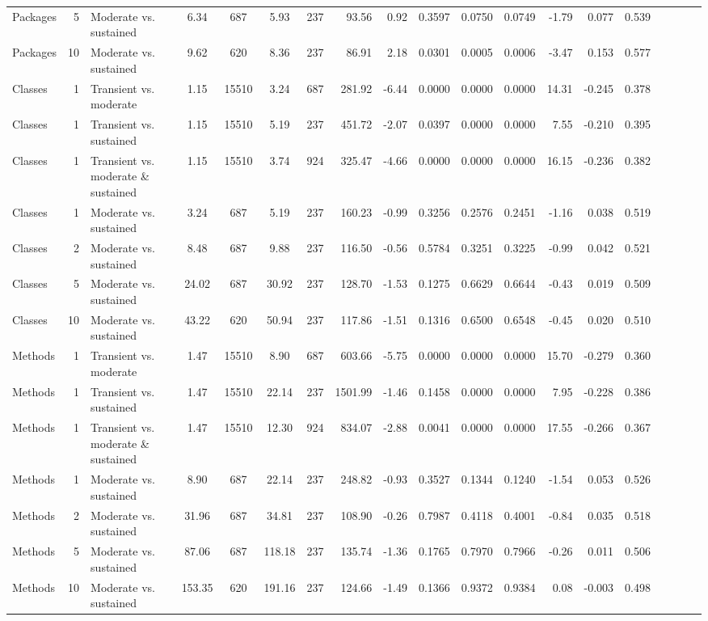 \begin{table}[H]
{\begin{tabular}{l r p{4cm} c c c c r r r r r r r r r r r r}
Packages & 5 & Moderate vs. sustained &  6.34 & 687 & 5.93 & 237 & 93.56 & 0.92 & 0.3597 & 0.0750 & 0.0749 & -1.79 & 0.077 & 0.539 \\ 
Packages & 10 & Moderate vs. sustained &  9.62 & 620 & 8.36 & 237 & 86.91 & 2.18 & 0.0301 & 0.0005 & 0.0006 & -3.47 & 0.153 & 0.577 \\ 
Classes & 1 & Transient vs. moderate &  1.15 & 15510 & 3.24 & 687 & 281.92 & -6.44 & 0.0000 & 0.0000 & 0.0000 & 14.31 & -0.245 & 0.378 \\ 
Classes & 1 & Transient vs. sustained &  1.15 & 15510 & 5.19 & 237 & 451.72 & -2.07 & 0.0397 & 0.0000 & 0.0000 & 7.55 & -0.210 & 0.395 \\ 
Classes & 1 & Transient vs. moderate \& sustained &  1.15 & 15510 & 3.74 & 924 & 325.47 & -4.66 & 0.0000 & 0.0000 & 0.0000 & 16.15 & -0.236 & 0.382 \\ 
Classes & 1 & Moderate vs. sustained &  3.24 & 687 & 5.19 & 237 & 160.23 & -0.99 & 0.3256 & 0.2576 & 0.2451 & -1.16 & 0.038 & 0.519 \\ 
Classes & 2 & Moderate vs. sustained &  8.48 & 687 & 9.88 & 237 & 116.50 & -0.56 & 0.5784 & 0.3251 & 0.3225 & -0.99 & 0.042 & 0.521 \\ 
Classes & 5 & Moderate vs. sustained &  24.02 & 687 & 30.92 & 237 & 128.70 & -1.53 & 0.1275 & 0.6629 & 0.6644 & -0.43 & 0.019 & 0.509 \\ 
Classes & 10 & Moderate vs. sustained &  43.22 & 620 & 50.94 & 237 & 117.86 & -1.51 & 0.1316 & 0.6500 & 0.6548 & -0.45 & 0.020 & 0.510 \\ 
Methods & 1 & Transient vs. moderate &  1.47 & 15510 & 8.90 & 687 & 603.66 & -5.75 & 0.0000 & 0.0000 & 0.0000 & 15.70 & -0.279 & 0.360 \\ 
Methods & 1 & Transient vs. sustained &  1.47 & 15510 & 22.14 & 237 & 1501.99 & -1.46 & 0.1458 & 0.0000 & 0.0000 & 7.95 & -0.228 & 0.386 \\ 
Methods & 1 & Transient vs. moderate \& sustained &  1.47 & 15510 & 12.30 & 924 & 834.07 & -2.88 & 0.0041 & 0.0000 & 0.0000 & 17.55 & -0.266 & 0.367 \\ 
Methods & 1 & Moderate vs. sustained &  8.90 & 687 & 22.14 & 237 & 248.82 & -0.93 & 0.3527 & 0.1344 & 0.1240 & -1.54 & 0.053 & 0.526 \\ 
Methods & 2 & Moderate vs. sustained &  31.96 & 687 & 34.81 & 237 & 108.90 & -0.26 & 0.7987 & 0.4118 & 0.4001 & -0.84 & 0.035 & 0.518 \\ 
Methods & 5 & Moderate vs. sustained &  87.06 & 687 & 118.18 & 237 & 135.74 & -1.36 & 0.1765 & 0.7970 & 0.7966 & -0.26 & 0.011 & 0.506 \\ 
Methods & 10 & Moderate vs. sustained &  153.35 & 620 & 191.16 & 237 & 124.66 & -1.49 & 0.1366 & 0.9372 & 0.9384 & 0.08 & -0.003 & 0.498 \\ 
\bottomrule
\end{tabular}%
} 
\end{table}
\newpage 

